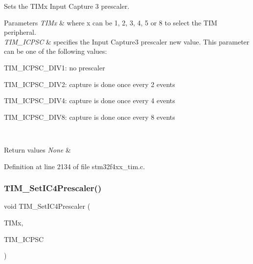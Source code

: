 Sets the T\+I\+Mx Input Capture 3 prescaler. 


\begin{DoxyParams}{Parameters}
{\em T\+I\+Mx} & where x can be 1, 2, 3, 4, 5 or 8 to select the T\+IM peripheral. \\
\hline
{\em T\+I\+M\+\_\+\+I\+C\+P\+SC} & specifies the Input Capture3 prescaler new value. This parameter can be one of the following values\+: \begin{DoxyItemize}
\item T\+I\+M\+\_\+\+I\+C\+P\+S\+C\+\_\+\+D\+I\+V1\+: no prescaler \item T\+I\+M\+\_\+\+I\+C\+P\+S\+C\+\_\+\+D\+I\+V2\+: capture is done once every 2 events \item T\+I\+M\+\_\+\+I\+C\+P\+S\+C\+\_\+\+D\+I\+V4\+: capture is done once every 4 events \item T\+I\+M\+\_\+\+I\+C\+P\+S\+C\+\_\+\+D\+I\+V8\+: capture is done once every 8 events \end{DoxyItemize}
\\
\hline
\end{DoxyParams}

\begin{DoxyRetVals}{Return values}
{\em None} & \\
\hline
\end{DoxyRetVals}


Definition at line 2134 of file stm32f4xx\+\_\+tim.\+c.

\mbox{\label{group___t_i_m_ga0f2c784271356d6b64b8c0da64dbdbc2}} 
\subsubsection{\texorpdfstring{T\+I\+M\+\_\+\+Set\+I\+C4\+Prescaler()}{TIM\_SetIC4Prescaler()}}
{\footnotesize\ttfamily void T\+I\+M\+\_\+\+Set\+I\+C4\+Prescaler (\begin{DoxyParamCaption}\item[{\hyperlink{struct_t_i_m___type_def}{T\+I\+M\+\_\+\+Type\+Def} $\ast$}]{T\+I\+Mx,  }\item[{uint16\+\_\+t}]{T\+I\+M\+\_\+\+I\+C\+P\+SC }\end{DoxyParamCaption})}




